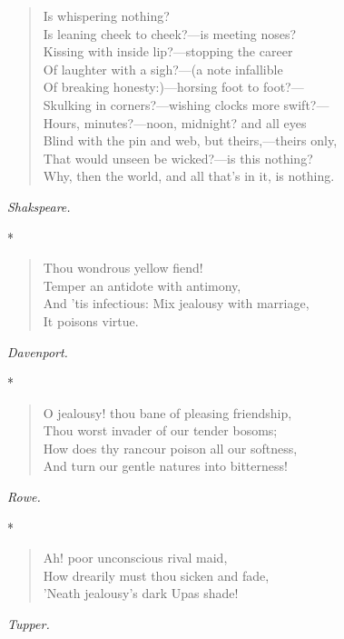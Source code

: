 \documentclass[11pt,twoside]{article}
\newcommand\stars{\begin{center}*\quad*\quad*\end{center}}
\newcommand\by[1]{\par\hfill\textit{#1}\par}
\begin{document}
\begin{verse}
\quad Is whispering nothing?\\
Is leaning cheek to cheek?---is meeting noses?\\
Kissing with inside lip?---stopping the career\\
Of laughter with a sigh?---(a note infallible\\
Of breaking honesty:)---horsing foot to foot?---\\
Skulking in corners?---wishing clocks more swift?---\\
Hours, minutes?---noon, midnight? and all eyes\\
Blind with the pin and web, but theirs,---theirs only,\\
That would unseen be wicked?---is this nothing?\\
Why, then the world, and all that’s in it, is nothing.
\end{verse}

\by{Shakspeare.}

\stars

\begin{verse}
Thou wondrous yellow fiend!\\
Temper an antidote with antimony,\\
And ’tis infectious: Mix jealousy with marriage,\\
It poisons virtue.
\end{verse}

\by{Davenport.}

\stars

\begin{verse}
O jealousy! thou bane of pleasing friendship,\\
Thou worst invader of our tender bosoms;\\
How does thy rancour poison all our softness,\\
And turn our gentle natures into bitterness!
\end{verse}

\by{Rowe.}

\stars

\begin{verse}
Ah! poor unconscious rival maid,\\
How drearily must thou sicken and fade,\\
’Neath jealousy’s dark Upas shade!
\end{verse}

\by{Tupper.}
\end{document}
